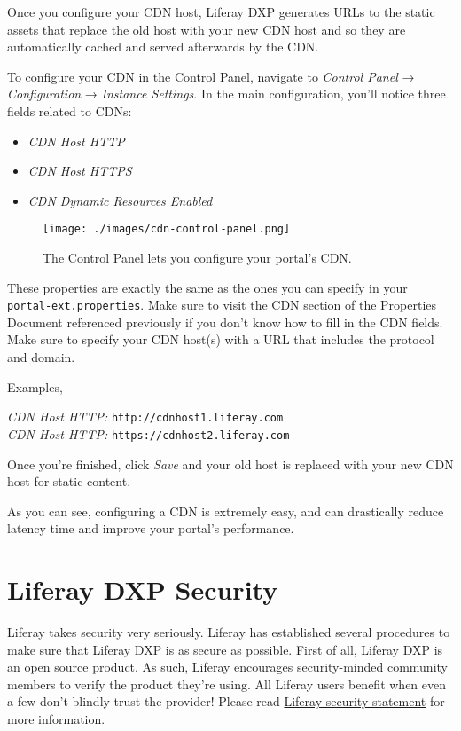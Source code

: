 Once you configure your CDN host, Liferay DXP generates URLs to the
static assets that replace the old host with your new CDN host and so
they are automatically cached and served afterwards by the CDN.

To configure your CDN in the Control Panel, navigate to \emph{Control
Panel} → \emph{Configuration} → \emph{Instance Settings}. In the main
configuration, you'll notice three fields related to CDNs:

\begin{itemize}
\tightlist
\item
  \emph{CDN Host HTTP}
\item
  \emph{CDN Host HTTPS}
\item
  \emph{CDN Dynamic Resources Enabled}
\end{itemize}

\begin{figure}
\centering
\texttt{[image: ./images/cdn-control-panel.png]}
\caption{The Control Panel lets you configure your portal's CDN.}
\end{figure}

These properties are exactly the same as the ones you can specify in
your \texttt{portal-ext.properties}. Make sure to visit the CDN section
of the Properties Document referenced previously if you don't know how
to fill in the CDN fields. Make sure to specify your CDN host(s) with a
URL that includes the protocol and domain.

Examples,

\emph{CDN Host HTTP:} \texttt{http://cdnhost1.liferay.com}\\
\emph{CDN Host HTTP:} \texttt{https://cdnhost2.liferay.com}

Once you're finished, click \emph{Save} and your old host is replaced
with your new CDN host for static content.

As you can see, configuring a CDN is extremely easy, and can drastically
reduce latency time and improve your portal's performance.

\chapter{Liferay DXP Security}\label{liferay-dxp-security}

Liferay takes security very seriously. Liferay has established several
procedures to make sure that Liferay DXP is as secure as possible. First
of all, Liferay DXP is an open source product. As such, Liferay
encourages security-minded community members to verify the product
they're using. All Liferay users benefit when even a few don't blindly
trust the provider! Please read
\href{https://liferay.com/security}{Liferay security statement} for more
information.

